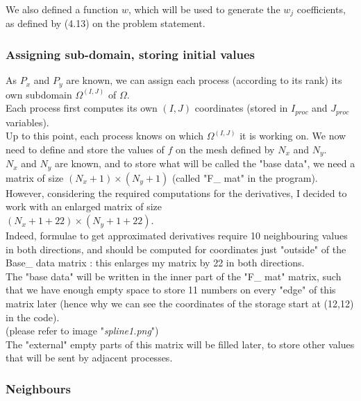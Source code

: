 \documentclass[10pt]{article}
\begin{document}
We also defined a function $w$, which will be used to generate the $w_j$ coefficients, as defined by (4.13) on the problem statement.


\subsubsection{Assigning sub-domain, storing initial values}


As $P_x$ and $P_y$ are known, we can assign each process (according to its rank) its own subdomain $\Omega^{(I,J)}$ of $\Omega$.\\
Each process first computes its own $ (I,J)$ coordinates (stored in $I_{proc}$ and $ J_{proc}$ variables).\\

Up to this point, each process knows on which $\Omega^{(I,J)}$ it is working on. We now need to define and store the values of $f$ on the mesh defined by $N_x$ and $N_y$.\\

$N_x$ and $N_y$ are known, and to store what will be called the "base data", we need a matrix of size $(N_x+1) \times (N_y+1)$ (called "F\_ mat" in the program).\\

However, considering the required computations for the derivatives, I decided to work with an enlarged matrix of size\\ $(N_x+1+22) \times (N_y+1+22)$.\\

Indeed, formulae to get approximated derivatives require 10 neighbouring values in both directions, and should be computed for coordinates just "outside" of the Base\_ data matrix : this enlarges my matrix by 22 in both directions.\\

The "base data" will be written in the inner part of the "F\_ mat" matrix, such that we have enough empty space to store 11 numbers on every "edge" of this matrix later (hence why we can see the coordinates of the storage start at (12,12) in the code).\\

(please refer to image "\textit{spline1.png}")\\

The "external" empty parts of this matrix will be filled later, to store other values that will be sent by adjacent processes.


\subsubsection{Neighbours}
\end{document}
